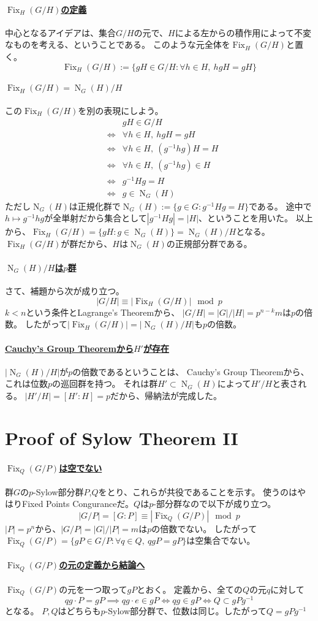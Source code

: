 \documentclass[a4paper]{jarticle}
\newcommand{\Fix}{\operatorname{Fix}}
\newcommand{\Norm}{\operatorname{N}}
\newcommand{\ulpar}[1]{\paragraph{\underline{#1}}}
\begin{document}
    \ulpar{$\Fix_{H}(G/H)$の定義}
    中心となるアイデアは、集合$G/H$の元で、$H$による左からの積作用によって不変なものを考える、ということである。
    このような元全体を$\Fix_{H}(G/H)$と置く。
    \[
        \Fix_{H}(G/H) := \{ gH \in G/H : \forall h \in H,~ hgH=gH \}
    \]

    \ulpar{$\Fix_{H}(G/H)=\Norm_G(H)/H$}
    この$\Fix_{H}(G/H)$を別の表現にしよう。
    \begin{eqnarray*}
        &{}&    gH \in G/H \\
        &\iff&  \forall h \in H,~ hgH=gH \\
        &\iff&  \forall h \in H,~ (g^{-1}hg)H=H \\
        &\iff&  \forall h \in H,~ (g^{-1}hg) \in H \\
        &\iff&  g^{-1}Hg = H \\
        &\iff&  g \in \Norm_G(H)
    \end{eqnarray*}
    ただし$\Norm_G(H)$は正規化群で$\Norm_G(H) := \{ g \in G : g^{-1}Hg = H\}$である。
    途中で$h \mapsto g^{-1}hg$が全単射だから集合として$|g^{-1}Hg|=|H|$、ということを用いた。
    以上から、$\Fix_{H}(G/H)=\{ gH : g \in \Norm_G(H) \} = \Norm_G(H)/H$となる。
    $\Fix_{H}(G/H)$が群だから、$H$は$\Norm_G(H)$の正規部分群である。

    \ulpar{$\Norm_G(H)/H$は$p$群}
    さて、補題から次が成り立つ。
    \[ |G/H| \equiv |\Fix_{H}(G/H)| \mod p \]
    $k<n$という条件とLagrange's Theoremから、
    $|G/H|=|G|/|H|=p^{n-k}m$は$p$の倍数。
    したがって$|\Fix_{H}(G/H)|=|\Norm_G(H)/H|$も$p$の倍数。

    \ulpar{Cauchy's Group Theoremから$H'$が存在}
    $|\Norm_G(H)/H|$が$p$の倍数であるということは、
    Cauchy's Group Theoremから、これは位数$p$の巡回群を持つ。
    それは群$H' \subset \Norm_G(H)$によって$H'/H$と表される。
    $|H'/H|=[H':H]=p$だから、帰納法が完成した。
    

    \section{Proof of Sylow Theorem II}
    \ulpar{$\Fix_Q(G/P)$は空でない}
    群$G$の$p$-Sylow部分群$P$,$Q$をとり、これらが共役であることを示す。
    使うのはやはりFixed Points Conguranceだ。$Q$は$p$-部分群なので以下が成り立つ。
    \[ |G/P|=[G:P] \equiv |\Fix_Q(G/P)| \mod p \]
    $|P|=p^n$から、$|G/P|=|G|/|P|=m$は$p$の倍数でない。
    したがって$\Fix_Q(G/P)=\{ gP \in G/P : \forall q \in Q,~ qgP=gP \}$は空集合でない。

    \ulpar{$\Fix_Q(G/P)$の元の定義から結論へ}
    $\Fix_Q(G/P)$の元を一つ取って$gP$とおく。
    定義から、全ての$Q$の元$q$に対して
    \[ qg \cdot P=gP \implies qg \cdot e \in gP \iff qg \in gP \iff Q \subset gPg^{-1} \]となる。
    $P,Q$はどちらも$p$-Sylow部分群で、位数は同じ。したがって$Q=gPg^{-1}$
    
\end{document}
